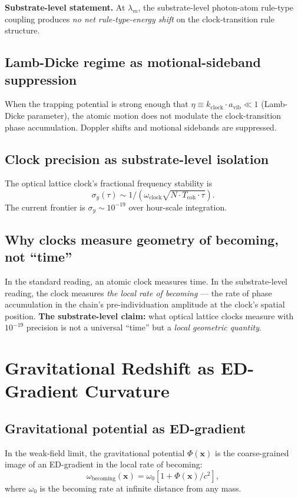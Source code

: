 \documentclass[11pt,a4paper]{article}
\begin{document}
\textbf{Substrate-level statement.} At $\lambda_m$, the substrate-level photon-atom rule-type coupling produces \emph{no net rule-type-energy shift} on the clock-transition rule structure.

\subsection{Lamb-Dicke regime as motional-sideband suppression}

When the trapping potential is strong enough that $\eta \equiv k_{\mathrm{clock}}\cdot a_{\mathrm{vib}} \ll 1$ (Lamb-Dicke parameter), the atomic motion does not modulate the clock-transition phase accumulation. Doppler shifts and motional sidebands are suppressed.

\subsection{Clock precision as substrate-level isolation}

The optical lattice clock's fractional frequency stability is
\[
\sigma_y(\tau) \sim 1/(\omega_{\mathrm{clock}}\sqrt{N\cdot T_{\mathrm{coh}}\cdot\tau}).
\]
The current frontier is $\sigma_y \sim 10^{-19}$ over hour-scale integration.

\subsection{Why clocks measure geometry of becoming, not ``time''}

In the standard reading, an atomic clock measures time. In the substrate-level reading, the clock measures \emph{the local rate of becoming} --- the rate of phase accumulation in the chain's pre-individuation amplitude at the clock's spatial position. \textbf{The substrate-level claim:} what optical lattice clocks measure with $10^{-19}$ precision is not a universal ``time'' but a \emph{local geometric quantity}.

\section{Gravitational Redshift as ED-Gradient Curvature}

\subsection{Gravitational potential as ED-gradient}

In the weak-field limit, the gravitational potential $\Phi(\mathbf{x})$ is the coarse-grained image of an ED-gradient in the local rate of becoming:
\[
\omega_{\mathrm{becoming}}(\mathbf{x}) = \omega_0[1 + \Phi(\mathbf{x})/c^2],
\]
where $\omega_0$ is the becoming rate at infinite distance from any mass.
\end{document}
